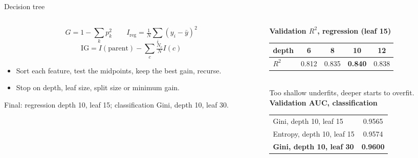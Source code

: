 \documentclass[aspectratio=169,11pt]{beamer}
\newcommand{\aside}[1]{{\footnotesize\color{muted}#1}}
\begin{document}
\begin{frame}[t]{Decision tree}
  \begin{columns}[T,onlytextwidth]
    \begin{column}{0.50\textwidth}
      \vspace{0.3em}
      {\small
      \[ G = 1-\sum_k p_k^2 \qquad I_{\text{reg}}=\tfrac1N\sum_i (y_i-\bar y)^2 \]
      \[ \mathrm{IG}=I(\text{parent})-\sum_{c}\tfrac{N_c}{N}I(c) \]}
      \begin{itemize}\setlength\itemsep{0.35em}\small
        \item Sort each feature, test the midpoints, keep the best gain, recurse.
        \item Stop on depth, leaf size, split size or minimum gain.
      \end{itemize}
      \aside{Final: regression depth 10, leaf 15; classification Gini, depth 10, leaf 30.}
    \end{column}
    \begin{column}{0.40\textwidth}
      \vspace{0.4em}
      {\small\bfseries Validation $R^2$, regression (leaf 15)}\\[3pt]
      \footnotesize
      \renewcommand{\arraystretch}{1.2}\setlength{\tabcolsep}{4pt}
      \begin{tabular}{@{}lcccc@{}}
        \toprule
        depth & 6 & 8 & \textbf{10} & 12\\
        \midrule
        $R^2$ & 0.812 & 0.835 & \textbf{0.840} & 0.838\\
        \bottomrule
      \end{tabular}\\[4pt]
      \aside{Too shallow underfits, deeper starts to overfit.}\\[8pt]
      {\small\bfseries Validation AUC, classification}\\[3pt]
      \footnotesize
      \begin{tabular}{@{}lc@{}}
        \toprule
        Gini, depth 10, leaf 15 & 0.9565\\
        Entropy, depth 10, leaf 15 & 0.9574\\
        \textbf{Gini, depth 10, leaf 30} & \textbf{0.9600}\\
        \bottomrule
      \end{tabular}
    \end{column}
  \end{columns}
\end{frame}
\end{document}
